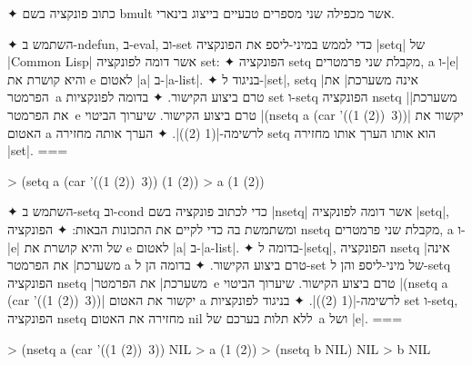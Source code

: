 \begin{enumerate}
  ✦ כתוב פונקציה בשם bmult אשר מכפילה שני מספרים טבעיים בייצוג בינארי.

  ✦ השתמש ב-ndefun, ב-eval, וב-set כדי לממש במיני-ליספ את הפונקציה \E|setq| של
  \E|Common Lisp| אשר דומה לפונקציה set:
  ✦ הפונקציה setq מקבלת שני פרמטרים, a ו-\E|e| והיא קושרת את e לאטום \E|a|
  ב-\E|a-list|.
  ✦ בניגוד ל-\E|set|, setq \ע|אינה משערכת| את הפרמטר~a טרם ביצוע הקישור.
  ✦ בדומה לפונקציות set ו-setq הפונקציה nsetq \ע|משערכת| את הפרמטר~e טרם ביצוע
  הקישור. שיערוך הביטוי \T|(nsetq a (car '((1 (2))~3))| יקשור את האטום a
  לרשימה-\T|(1 (2))|.
  ✦ הערך אותה מחזירה setq הוא אותו הערך אותו מחזירה \E|set|.
===
  \begin{LISP}
> (setq a (car '((1 (2))~3))
(1 (2))
> a
(1 (2))
\end{LISP}

  ✦ השתמש ב-setq וב-cond כדי לכתוב פונקציה בשם \E|nsetq| אשר דומה לפונקציה
  \E|setq|, ומשתמשת בה כדי לקיים את התכונות הבאות:
  ✦ הפונקציה nsetq מקבלת שני פרמטרים, a ו-\E|e| של והיא קושרת את e לאטום \E|a|
  ב-\E|a-list|.
  ✦ בדומה ל-\E|setq|, הפונקציה nsetq \ע|אינה משערכת| את הפרמטר a טרם ביצוע
  הקישור.
  ✦ בדומה הן ל-set של מיני-ליספ והן ל-setq הפונקציה nsetq \ע|משערכת| את
  הפרמטר~e טרם ביצוע הקישור. שיערוך הביטוי \T|(nsetq a (car '((1 (2))~3))|
  יקשור את האטום a לרשימה-\T|(1 (2))|.
  ✦ בניגוד לפונקציות set ו-setq, הפונקציה nsetq מחזירה את האטום nil ללא תלות
  בערכם של~a ושל \E|e|.
===
  \begin{LISP}
> (nsetq a (car '((1 (2))~3))
NIL
> a
(1 (2))
> (nsetq b NIL)
NIL
> b
NIL
\end{LISP}
\end{enumerate}
